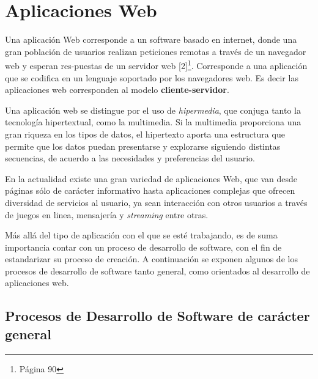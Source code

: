 \section{Aplicaciones Web}

Una aplicación Web corresponde a un software basado en internet, donde una gran población de usuarios realizan peticiones
remotas a través de un navegador web y esperan res-puestas de un servidor web [2]\footnote{Página 90}. Corresponde a una aplicación que 
se codifica en un lenguaje soportado por los navegadores web.
Es decir las aplicaciones web corresponden al modelo \textbf{cliente-servidor}. 

Una aplicación web se distingue por el uso de \textit{hipermedia}, que conjuga tanto la tecnología hipertextual, como 
la multimedia. Si la multimedia proporciona una gran riqueza en los tipos de datos, el hipertexto aporta una estructura 
que permite que los datos puedan presentarse y explorarse siguiendo distintas secuencias, de acuerdo a las necesidades y 
preferencias del usuario.

En la actualidad existe una gran variedad de aplicaciones Web, que van desde páginas sólo de carácter informativo
hasta aplicaciones complejas que ofrecen diversidad de servicios al usuario, ya sean interacción
con otros usuarios a través de juegos en linea, mensajería y \textit{streaming} entre otras.

Más allá del tipo de aplicación con el que se esté trabajando, es de suma importancia contar con un proceso de desarrollo de software,
con el fin de estandarizar su proceso de creación. A continuación se exponen algunos de los procesos de desarrollo de software
tanto general, como orientados al desarrollo de aplicaciones web.

\subsection{Procesos de Desarrollo de Software de carácter general}

